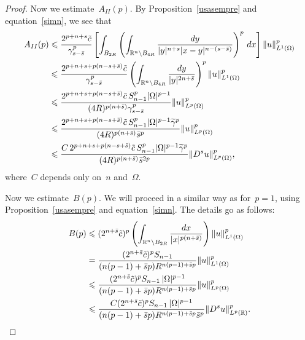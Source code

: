 \documentclass[10pt,a4paper]{amsart}
\newcommand{\R}{\mathbb{R}}
\newcommand{\bs}{\Bar{s}}
\renewcommand{\le}{\leqslant}
\renewcommand{\leq}{\leqslant}
\begin{document}
\begin{proof}
			Now we estimate~$A_{II}(p)$. By Proposition~\ref{usasempre} and equation~\eqref{simn}, we see that
\begin{equation*}\begin{split}
A_{II}(p) &\leq \frac{2^{p+n+s} \Tilde{c}}{\gamma^p_{s-\bar{s}}}  \left[ \int_{B_{2R}} \left( \int_{\R^n \setminus B_{4R}} \frac{dy}{|y|^{n+s} |x-y|^{n-(s-\bs)}}\right)^p \, dx \right] \Vert u \Vert_{L^1(\Omega)}^p \\ & 
\leq  \frac{2^{p+n+s+p(n-s+\bar s)} \Tilde{c}}{\gamma^p_{s-\bar{s}}}
\left(\int_{\R^n \setminus B_{4R}} \frac{dy}{|y|^{2n+ \bs}}\right)^p \Vert u \Vert_{L^1(\Omega)}^p \\&\le
\frac{2^{p+n+s+p(n-s+\bar s)} \Tilde{c}\,S_{n-1}^p|\Omega|^{p-1}}{(4R)^{p(n+\bar s)}\gamma^p_{s-\bar{s}}} \Vert u \Vert_{L^p(\Omega)}^p\\&  \leq
\frac{2^{p+n+s+p(n-s+\bar s)} \Tilde{c}\,S_{n-1}^p|\Omega|^{p-1}\widetilde\gamma^p}{(4R)^{p(n+\bar s)}\bar{s}^p} \Vert u \Vert_{L^p(\Omega)}^p\\&\le 
\frac{C\,2^{p+n+s+p(n-s+\bar s)} \Tilde{c}\,S_{n-1}^p|\Omega|^{p-1}\widetilde\gamma^p}{(4R)^{p(n+\bar s)}\bar{s}^{2p}} \Vert D^su \Vert_{L^p(\Omega)}^p
,\end{split}\end{equation*}
where~$C$ depends only on~$n$ and~$\Omega$.
			
Now we estimate~$B(p)$. We will proceed in a similar way as for~$p=1$,
using Proposition~\ref{usasempre} and equation~\eqref{simn}. The details go as follows:
\begin{equation*}\begin{split}
B(p)& \leq (2^{n+ \bar{s}} \Tilde{c})^p  \left( \int_{\R^n \setminus B_{2R}} \frac{dx}{|x|^{p(n+ \bs)}}\right) \Vert u \Vert^p_{L^1(\Omega)} \\
& =  \frac{(2^{n+ \bar{s}} \Tilde{c})^p S_{n-1} }{(n(p-1)+ \bar{s}p) R^{n(p-1)+ \bar{s}p}} \Vert u \Vert^p_{L^1(\Omega)}\\&\leq 
\frac{(2^{n+ \bar{s}} \Tilde{c})^p S_{n-1}\,|\Omega|^{p-1} }{(n(p-1)+ \bar{s}p) R^{n(p-1)+ \bar{s}p}} \Vert u \Vert^p_{L^p(\Omega)}
\\& \le \frac{C(2^{n+ \bar{s}} \Tilde{c})^p S_{n-1}\,|\Omega|^{p-1} }{(n(p-1)+ \bar{s}p) R^{n(p-1)+ \bar{s}p}\bar{s}^p}  \Vert D^s u \Vert^p_{L^p(\R)}.
\end{split}\end{equation*}


\end{proof}
\end{document}
